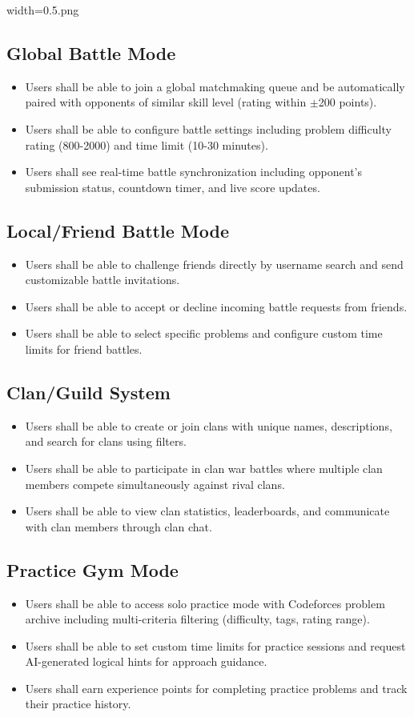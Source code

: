 width=0.5\linewidthimage.png\documentclass[12pt,a4paper]{article}
\begin{document}
\subsection{Global Battle Mode}
\begin{itemize}
\item Users shall be able to join a global matchmaking queue and be automatically paired with opponents of similar skill level (rating within $\pm$200 points).
\item Users shall be able to configure battle settings including problem difficulty rating (800-2000) and time limit (10-30 minutes).
\item Users shall see real-time battle synchronization including opponent's submission status, countdown timer, and live score updates.
\end{itemize}

\subsection{Local/Friend Battle Mode}
\begin{itemize}
\item Users shall be able to challenge friends directly by username search and send customizable battle invitations.
\item Users shall be able to accept or decline incoming battle requests from friends.
\item Users shall be able to select specific problems and configure custom time limits for friend battles.
\end{itemize}

\subsection{Clan/Guild System}
\begin{itemize}
\item Users shall be able to create or join clans with unique names, descriptions, and search for clans using filters.
\item Users shall be able to participate in clan war battles where multiple clan members compete simultaneously against rival clans.
\item Users shall be able to view clan statistics, leaderboards, and communicate with clan members through clan chat.
\end{itemize}

\subsection{Practice Gym Mode}
\begin{itemize}
\item Users shall be able to access solo practice mode with Codeforces problem archive including multi-criteria filtering (difficulty, tags, rating range).
\item Users shall be able to set custom time limits for practice sessions and request AI-generated logical hints for approach guidance.
\item Users shall earn experience points for completing practice problems and track their practice history.
\end{itemize}
\end{document}
